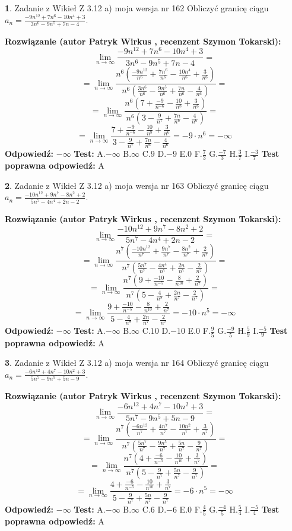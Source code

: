 \documentclass[12pt, a4paper]{article}
\theoremstyle{definition} %
\newtheorem{zad}{}
\newcommand{\zadStart}[1]{\begin{zad}#1\newline}
\newcommand{\zadStop}{\end{zad}}
\newcommand{\rozwStart}[2]{\noindent \textbf{Rozwiązanie (autor #1 , recenzent #2): }\newline}
\newcommand{\rozwStop}{\newline}
\newcommand{\odpStart}{\noindent \textbf{Odpowiedź:}\newline}
\newcommand{\odpStop}{\newline}
\newcommand{\testStart}{\noindent \textbf{Test:}\newline}
\newcommand{\testStop}{\newline}
\newcommand{\kluczStart}{\noindent \textbf{Test poprawna odpowiedź:}\newline}
\newcommand{\kluczStop}{\newline}
\begin{document}
\zadStart{Zadanie z Wikieł Z 3.12 a) moja wersja nr 162}
Obliczyć granicę ciągu $a_{n}=\frac{-9n^{12}+7n^{6}-10n^{4}+3}{3n^{6}-9n^{5}+7n-4}$.
\zadStop
\rozwStart{Patryk Wirkus}{Szymon Tokarski}
$$\lim\limits_{n\to\infty}\frac{-9n^{12}+7n^{6}-10n^{4}+3}{3n^{6}-9n^{5}+7n-4}=$$
$$=\lim\limits_{n\to\infty}\frac{n^{6}\left(\frac{-9n^{12}}{n^{6}}+\frac{7n^{6}}{n^{6}}-\frac{10n^{4}}{n^{6}}+\frac{3}{n^{6}}\right)}{n^{6}\left(\frac{3n^{6}}{n^{6}}-\frac{9n^{5}}{n^{6}}+\frac{7n}{n^{6}}-\frac{4}{n^{6}}\right)}=$$
$$=\lim\limits_{n\to\infty}\frac{n^{6}\left(7+\frac{-9}{n^{-6}}-\frac{10}{n^{8}}+\frac{3}{n^{6}}\right)}
{n^{6}\left(3-\frac{9}{n^{7}}+\frac{7n}{n^{6}}-\frac{4}{n^{6}}\right)}=$$
$$=\lim\limits_{n\to\infty}\frac{7+\frac{-9}{n^{-6}}-\frac{10}{n^{8}}+\frac{3}{n^{6}}}{3-\frac{9}{n^{7}}+\frac{7n}{n^{6}}-\frac{4}{n^{6}}}=-9\cdot n^{6} = -\infty$$
\rozwStop
\odpStart
$-\infty$
\odpStop
\testStart
A.$-\infty$
B.$\infty$
C.$9$
D.$-9$
E.$0$
F.$\frac{7}{3}$
G.$\frac{-7}{3}$
H.$\frac{3}{7}$
I.$\frac{-3}{7}$
\testStop
\kluczStart
A
\kluczStop



\zadStart{Zadanie z Wikieł Z 3.12 a) moja wersja nr 163}
Obliczyć granicę ciągu $a_{n}=\frac{-10n^{12}+9n^{7}-8n^{2}+2}{5n^{7}-4n^{4}+2n-2}$.
\zadStop
\rozwStart{Patryk Wirkus}{Szymon Tokarski}
$$\lim\limits_{n\to\infty}\frac{-10n^{12}+9n^{7}-8n^{2}+2}{5n^{7}-4n^{4}+2n-2}=$$
$$=\lim\limits_{n\to\infty}\frac{n^{7}\left(\frac{-10n^{12}}{n^{7}}+\frac{9n^{7}}{n^{7}}-\frac{8n^{2}}{n^{7}}+\frac{2}{n^{7}}\right)}{n^{7}\left(\frac{5n^{7}}{n^{7}}-\frac{4n^{4}}{n^{7}}+\frac{2n}{n^{7}}-\frac{2}{n^{7}}\right)}=$$
$$=\lim\limits_{n\to\infty}\frac{n^{7}\left(9+\frac{-10}{n^{-5}}-\frac{8}{n^{10}}+\frac{2}{n^{7}}\right)}
{n^{7}\left(5-\frac{4}{n^{8}}+\frac{2n}{n^{7}}-\frac{2}{n^{7}}\right)}=$$
$$=\lim\limits_{n\to\infty}\frac{9+\frac{-10}{n^{-5}}-\frac{8}{n^{10}}+\frac{2}{n^{7}}}{5-\frac{4}{n^{8}}+\frac{2n}{n^{7}}-\frac{2}{n^{7}}}=-10\cdot n^{5} = -\infty$$
\rozwStop
\odpStart
$-\infty$
\odpStop
\testStart
A.$-\infty$
B.$\infty$
C.$10$
D.$-10$
E.$0$
F.$\frac{9}{5}$
G.$\frac{-9}{5}$
H.$\frac{5}{9}$
I.$\frac{-5}{9}$
\testStop
\kluczStart
A
\kluczStop



\zadStart{Zadanie z Wikieł Z 3.12 a) moja wersja nr 164}
Obliczyć granicę ciągu $a_{n}=\frac{-6n^{12}+4n^{7}-10n^{2}+3}{5n^{7}-9n^{5}+5n-9}$.
\zadStop
\rozwStart{Patryk Wirkus}{Szymon Tokarski}
$$\lim\limits_{n\to\infty}\frac{-6n^{12}+4n^{7}-10n^{2}+3}{5n^{7}-9n^{5}+5n-9}=$$
$$=\lim\limits_{n\to\infty}\frac{n^{7}\left(\frac{-6n^{12}}{n^{7}}+\frac{4n^{7}}{n^{7}}-\frac{10n^{2}}{n^{7}}+\frac{3}{n^{7}}\right)}{n^{7}\left(\frac{5n^{7}}{n^{7}}-\frac{9n^{5}}{n^{7}}+\frac{5n}{n^{7}}-\frac{9}{n^{7}}\right)}=$$
$$=\lim\limits_{n\to\infty}\frac{n^{7}\left(4+\frac{-6}{n^{-5}}-\frac{10}{n^{10}}+\frac{3}{n^{7}}\right)}
{n^{7}\left(5-\frac{9}{n^{7}}+\frac{5n}{n^{7}}-\frac{9}{n^{7}}\right)}=$$
$$=\lim\limits_{n\to\infty}\frac{4+\frac{-6}{n^{-5}}-\frac{10}{n^{10}}+\frac{3}{n^{7}}}{5-\frac{9}{n^{7}}+\frac{5n}{n^{7}}-\frac{9}{n^{7}}}=-6\cdot n^{5} = -\infty$$
\rozwStop
\odpStart
$-\infty$
\odpStop
\testStart
A.$-\infty$
B.$\infty$
C.$6$
D.$-6$
E.$0$
F.$\frac{4}{5}$
G.$\frac{-4}{5}$
H.$\frac{5}{4}$
I.$\frac{-5}{4}$
\testStop
\kluczStart
A
\kluczStop
\end{document}
